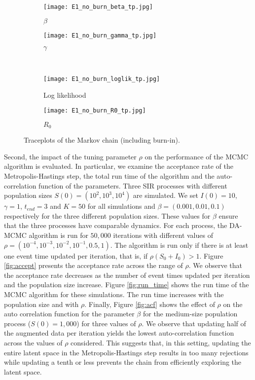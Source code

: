 \documentclass[11pt]{article}
\begin{document}
	\begin{figure}
		\centering
		\begin{subfigure}[b]{0.41\textwidth}
			\centering
			\texttt{[image: E1\_no\_burn\_beta\_tp.jpg]}
			\caption{$\beta$}
			\label{fig:traceplot_beta}
		\end{subfigure}
		\hfill
		\begin{subfigure}[b]{0.41\textwidth}
			\centering
			\texttt{[image: E1\_no\_burn\_gamma\_tp.jpg]}
			\caption{$\gamma$}
			\label{fig:traceplot_gamma}
		\end{subfigure}
		\\
		\begin{subfigure}[b]{0.41\textwidth}
			\centering
			\texttt{[image: E1\_no\_burn\_loglik\_tp.jpg]}
			\caption{Log likelihood}
			\label{fig:traceplot_loglik}
		\end{subfigure}
		\hfill
		\begin{subfigure}[b]{0.41\textwidth}
			\centering
			\texttt{[image: E1\_no\_burn\_R0\_tp.jpg]}
			\caption{$R_0$}
			\label{fig:traceplot_R0}
		\end{subfigure}
		\caption{Traceplots of the Markov chain (including burn-in).}
		\label{fig:traceplot}
	\end{figure}
	
	Second, the impact of the tuning parameter $\rho$ on the performance of the MCMC algorithm is evaluated. In particular, we examine the acceptance rate of the Metropolis-Hastings step, the total run time of the algorithm and the auto-correlation function of the parameters.
	Three SIR processes with different population sizes $S(0) = (10^2, 10^3, 10^4)$ are simulated. We set $I(0) =10$, $\gamma=1$, $t_{end} = 3$ and $K = 50$ for all simulations and $\beta = (0.001, 0.01, 0.1)$ respectively for the three different population sizes. These values for $\beta$ ensure that the three processes have comparable dynamics. For each process, the DA-MCMC algorithm is run for $50,000$ iterations with different values of $\rho = (10^{-4}, 10^{-3}, 10^{-2}, 10^{-1}, 0.5, 1)$. The algorithm is run only if there is at least one event time updated per iteration, that is, if $\rho(S_0+I_0)>1$.
	Figure \ref{fig:accept} presents the acceptance rate across the range of $\rho$.  We observe that the acceptance rate decreases as the number of event times updated per iteration and the population size increase.
	Figure \ref{fig:run_time} shows the run time of the MCMC algorithm for these simulations. The run time increases with the population size and with $\rho$.
	Finally, Figure \ref{fig:acf} shows the effect of $\rho$ on the auto correlation function for the parameter $\beta$ for the medium-size population process ($S(0) = 1,000$) for three values of $\rho$. We observe that updating half of the augmented data per iteration yields the lowest auto-correlation function across the values of $\rho$ considered. This suggests that, in this setting, updating the entire latent space in the Metropolis-Hastings step results in too many rejections while updating a tenth or less prevents the chain from efficiently exploring the latent space.
	
\end{document}
